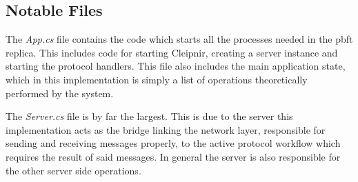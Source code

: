 
\subsection{Notable Files}
The \emph{App.cs} file contains the code which starts all the processes needed in the \ac{pbft} replica. This includes code for starting Cleipnir, creating a server instance and starting the protocol handlers. This file also includes the main application state, which in this implementation is simply a list of operations theoretically performed by the system.

The \emph{Server.cs} file is by far the largest. This is due to the server this implementation  acts as the bridge linking the network layer, responsible for sending and receiving messages properly, to the active protocol workflow which requires the result of said messages. In general the server is also responsible for the other server side operations.

